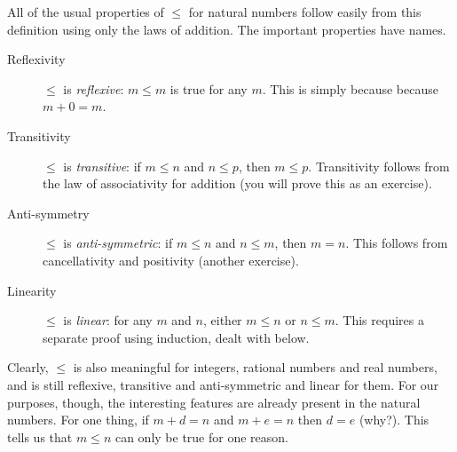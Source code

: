 All of the usual properties of $\leq$ for natural numbers follow
easily from this definition using only the laws of
addition. The important properties have names.

\begin{laws} 
\begin{description}
	\item[Reflexivity] $\leq$ is \emph{reflexive}: $m\leq
m$ is true for any $m$. This is simply because because $m + 0 =
m$. 
    \item[Transitivity] $\leq$ is \emph{transitive}: if $m\leq
n$ and $n\leq p$, then $m\leq p$. Transitivity follows from the law of
associativity for addition (you will prove this as an exercise).
    \item[Anti-symmetry] $\leq$ is \emph{anti-symmetric}: if $m\leq n$ and $n\leq m$, then
	$m=n$. This follows from cancellativity and positivity (another exercise).
	\item[Linearity] $\leq$ is \emph{linear}: for any $m$ and $n$, either $m\leq n$ or $n\leq m$. This requires a separate proof using induction, dealt with below.
\end{description}
\end{laws} 

Clearly, $\leq$ is also meaningful for integers, rational numbers and real numbers, and is still reflexive, transitive and anti-symmetric and linear for them.
For our purposes, though, the interesting features are already present in the natural numbers.
For one thing, if $m+d = n$ and $m+e = n$ then $d=e$ (why?). This tells us that $m\leq n$ can only be true for one reason.

\ipadbreak

